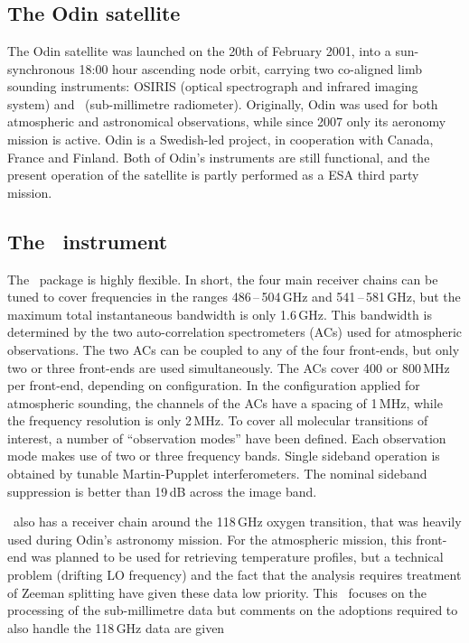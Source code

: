 \section{\smr}
\label{sec:smr}
%
\subsection{The Odin satellite}
\label{sec:odin}
%
The Odin satellite was launched on the 20th of February 2001, into a sun-synchronous
18:00 hour ascending node orbit, carrying two co-aligned limb sounding
instruments: OSIRIS (optical spectrograph and infrared imaging system) and
\SMR\ (sub-millimetre radiometer). Originally, Odin was used for both
atmospheric and astronomical observations, while since 2007 only its aeronomy
mission is active. Odin is a Swedish-led project, in cooperation with Canada,
France and Finland. Both of Odin's instruments are still functional, and the
present operation of the satellite is partly performed as a ESA third party
mission.


\subsection{The \SMR\ instrument}
\label{sec:smr:details}
%
The \smr\ package is highly flexible. In short, the four main receiver chains
can be tuned to cover frequencies in the ranges 486\,--\,504\,GHz and
541\,--\,581\,GHz, but the maximum total instantaneous bandwidth is only
1.6\,GHz. This bandwidth is determined by the two auto-correlation
spectrometers (ACs) used for atmospheric observations. The two ACs can be
coupled to any of the four front-ends, but only two or three front-ends are
used simultaneously. The ACs cover 400 or 800\,MHz per front-end, depending on
configuration. In the configuration applied for atmospheric sounding, the
channels of the ACs have a spacing of 1\,MHz, while the frequency resolution is
only 2\,MHz. To cover all molecular transitions
of interest, a number of ``observation modes'' have been defined. Each
observation mode makes use of two or three frequency bands. Single sideband
operation is obtained by tunable Martin-Pupplet interferometers. The nominal
sideband suppression is better than 19\,dB across the image band.

\smr\ also has a receiver chain around the 118\,GHz oxygen transition, that was
heavily used during Odin's astronomy mission. For the atmospheric mission, this
front-end was planned to be used for retrieving temperature profiles, but a
technical problem (drifting LO frequency) and the fact that the analysis
requires treatment of Zeeman splitting have given these data low priority. This
\ATBD\ focuses on the processing of the sub-millimetre data but comments on the
adoptions required to also handle the 118\,GHz data are given

